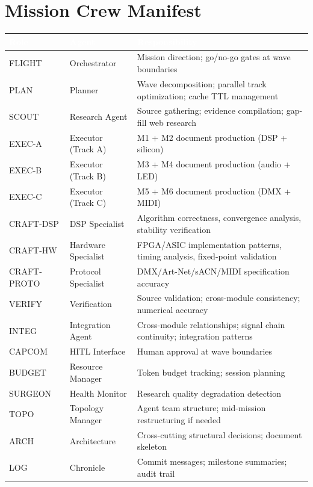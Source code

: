 \documentclass[11pt,letterpaper]{article}
\newcommand{\tableheader}[1]{\textbf{\sffamily\textcolor{white}{#1}}}
\begin{document}
\section{Mission Crew Manifest}

\begin{center}
\begin{tabularx}{\textwidth}{L{2.5cm}L{2.5cm}X}
\toprule
{}
\tableheader{Role} & \tableheader{Agent} & \tableheader{Responsibility} \\
\midrule
FLIGHT & Orchestrator & Mission direction; go/no-go gates at wave boundaries \\
PLAN & Planner & Wave decomposition; parallel track optimization; cache TTL management \\
SCOUT & Research Agent & Source gathering; evidence compilation; gap-fill web research \\
EXEC-A & Executor (Track A) & M1 + M2 document production (DSP + silicon) \\
EXEC-B & Executor (Track B) & M3 + M4 document production (audio + LED) \\
EXEC-C & Executor (Track C) & M5 + M6 document production (DMX + MIDI) \\
CRAFT-DSP & DSP Specialist & Algorithm correctness, convergence analysis, stability verification \\
CRAFT-HW & Hardware Specialist & FPGA/ASIC implementation patterns, timing analysis, fixed-point validation \\
CRAFT-PROTO & Protocol Specialist & DMX/Art-Net/sACN/MIDI specification accuracy \\
VERIFY & Verification & Source validation; cross-module consistency; numerical accuracy \\
INTEG & Integration Agent & Cross-module relationships; signal chain continuity; integration patterns \\
CAPCOM & HITL Interface & Human approval at wave boundaries \\
BUDGET & Resource Manager & Token budget tracking; session planning \\
SURGEON & Health Monitor & Research quality degradation detection \\
TOPO & Topology Manager & Agent team structure; mid-mission restructuring if needed \\
ARCH & Architecture & Cross-cutting structural decisions; document skeleton \\
LOG & Chronicle & Commit messages; milestone summaries; audit trail \\
\bottomrule
\end{tabularx}
\end{center}
\end{document}
